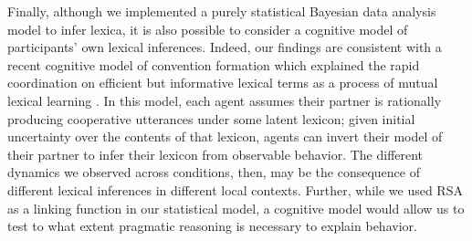 


Finally, although we implemented a purely statistical Bayesian data analysis model to infer lexica, it is also possible to consider a cognitive model of participants' own lexical inferences. Indeed, our findings are consistent with a recent cognitive model of convention formation which explained the rapid coordination on efficient but informative lexical terms as a process of mutual lexical learning \cite{HawkinsFrankGoodman17_ConventionFormation}. %
In this model, each agent assumes their partner is rationally producing cooperative utterances under some latent lexicon; given initial uncertainty over the contents of that lexicon, agents can invert their model of their partner to infer their lexicon from observable behavior. 
The different dynamics we observed across conditions, then, may be the consequence of different lexical inferences in different local contexts. Further, while we used RSA as a linking function in our statistical model, a cognitive model would allow us to test to what extent pragmatic reasoning is necessary to explain behavior.%

